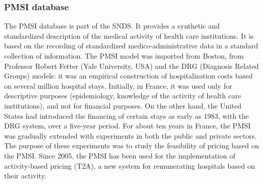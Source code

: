 \subsubsection{PMSI database}

The PMSI database is part of the SNDS. It provides a synthetic and standardized
description of the medical activity of health care institutions. It is based on
the recording of standardized medico-administrative data in a standard
collection of information. The PMSI model was imported
from Boston, from Professor Robert Fetter (Yale University, USA) and the DRG
(Diagnosis Related Groups) models: it was an empirical construction of
hospitalization costs based on several million hospital stays. Initially, in
France, it was used only for descriptive purposes (epidemiology, knowledge of
the activity of health care institutions), and not for financial purposes. On
the other hand, the United States had introduced the financing of certain stays
as early as 1983, with the DRG system, over a five-year period. For about ten
years in France, the PMSI was gradually extended with experiments in both the
public and private sectors. The purpose of these experiments was to study the
feasibility of pricing based on the PMSI. Since 2005, the PMSI has been used for
the implementation of activity-based pricing (T2A), a new system for
remunerating hospitals based on their activity.

